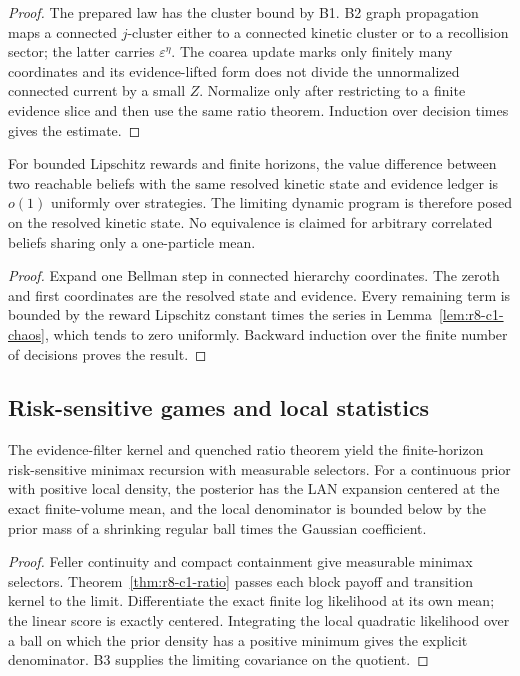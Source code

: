 \begin{proof}
The prepared law has the cluster bound by B1.  B2 graph propagation maps a
connected $j$-cluster either to a connected kinetic cluster or to a recollision
sector; the latter carries $\varepsilon^\eta$.  The coarea update marks only
finitely many coordinates and its evidence-lifted form does not divide the
unnormalized connected current by a small $Z$.  Normalize only after restricting
to a finite evidence slice and then use the same ratio theorem.  Induction over
decision times gives the estimate.
\end{proof}

\begin{theorem}
\label{thm:r8-c1-sufficiency}
For bounded Lipschitz rewards and finite horizons, the value difference between
two reachable beliefs with the same resolved kinetic state and evidence ledger
is $o(1)$ uniformly over strategies.  The limiting dynamic program is therefore
posed on the resolved kinetic state.  No equivalence is claimed for arbitrary
correlated beliefs sharing only a one-particle mean.
\end{theorem}

\begin{proof}
Expand one Bellman step in connected hierarchy coordinates.  The zeroth and
first coordinates are the resolved state and evidence.  Every remaining term
is bounded by the reward Lipschitz constant times the series in
Lemma~\ref{lem:r8-c1-chaos}, which tends to zero uniformly.  Backward induction
over the finite number of decisions proves the result.
\end{proof}

\subsection{Risk-sensitive games and local statistics}

\begin{theorem}
\label{thm:r8-c1-game-lan}
The evidence-filter kernel and quenched ratio theorem yield the finite-horizon
risk-sensitive minimax recursion with measurable selectors.  For a continuous
prior with positive local density, the posterior has the LAN expansion centered
at the exact finite-volume mean, and the local denominator is bounded below by
the prior mass of a shrinking regular ball times the Gaussian coefficient.
\end{theorem}

\begin{proof}
Feller continuity and compact containment give measurable minimax selectors.
Theorem~\ref{thm:r8-c1-ratio} passes each block payoff and transition kernel to
the limit.  Differentiate the exact finite log likelihood at its own mean; the
linear score is exactly centered.  Integrating the local quadratic likelihood
over a ball on which the prior density has a positive minimum gives the
explicit denominator.  B3 supplies the limiting covariance on the quotient.
\end{proof}
